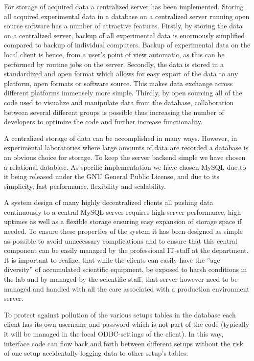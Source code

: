 For storage of acquired data a centralized server has been
implemented. Storing all acquired experimental data in a database on a
centralized server running open source software has a number of
attractive features. Firstly, by storing the data on a centralized
server, backup of all experimental data is enormously simplified
compared to backup of individual computers. Backup of experimental
data on the local client is hence, from a user's point of view
automatic, as this can be performed by routine jobs on the
server. Secondly, the data is stored in a standardized and open format
which allows for easy export of the data to any platform, open formats
or software source. This makes data exchange across different
platforms immensely more simple. Thirdly, by open sourcing all of the
code used to visualize and manipulate data from the database,
collaboration between several different groups is possible thus
increasing the number of developers to optimize the code and further
increase functionality.

A centralized storage of data can be accomplished in many
ways. However, in experimental laboratories where large amounts of
data are recorded a database is an obvious choice for storage. To keep
the server backend simple we have chosen a relational database. As
specific implementation we have chosen MySQL due to it being released
under the GNU General Public License\cite{gpl}, and due to its
simplicity, fast performance, flexibility and scalability.

A system design of many highly decentralized clients all pushing data
continuously to a central MySQL server requires high server
performance, high uptimes as well as a flexible storage ensuring easy
expansion of storage space if needed. To ensure these properties of
the system it has been designed as simple as possible to avoid
unnecessary complications and to ensure that this central component
can be easily managed by the professional IT-staff at the
department. It is important to realize, that while the clients can
easily have the ''age diversity'' of accumulated scientific equipment,
be exposed to harsh conditions in the lab and by managed by the
scientific staff, that server however need to be managed and handled
with all the care associated with a production environment server.

To protect against pollution of the various setups tables in the
database each client has its own username and password which is not
part of the code (typically it will be managed in the local
ODBC-settings of the client). In this way, interface code can flow
back and forth between different setups without the risk of one setup
accidentally logging data to other setup's tables.

